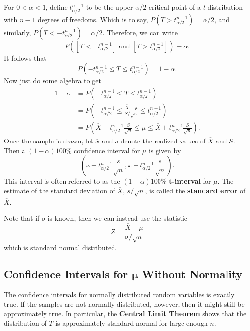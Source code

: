 \documentclass[12pt]{article}
\newcommand{\xbar}{\overline{X}}
\theoremstyle{definition}
\begin{document}
For $0<\alpha<1$, define $t_{\alpha/2}^{n-1}$ to be the upper $\alpha/2$ critical point of a $t$ distribution with $n-1$ degrees of freedoms. Which is to say, $P(T > t_{\alpha/2}^{n-1})=\alpha/2$, and similarly, $P(T < -t_{\alpha/2}^{n-1})=\alpha/2$. Therefore, we can write
	\[P\left( [T < -t_{\alpha/2}^{n-1}] \text{ and } [T > t_{\alpha/2}^{n-1}] \right)	= \alpha.\]
It follows that
	\[P(-t_{\alpha/2}^{n-1} \leq T \leq t_{\alpha/2}^{n-1}) = 1 - \alpha.	\]
	Now just do some algebra to get
\begin{align*}
	1 - \alpha	&= 	P\left(-t_{\alpha/2}^{n-1} \leq T \leq t_{\alpha/2}^{n-1} \right)	\\
		&=	P\left(-t_{\alpha/2}^{n-1} \leq  \frac{\overline{X} - \mu}{S / \sqrt{n}} \leq t_{\alpha/2}^{n-1} \right) 	\\
		&=	P\left(\overline{X} -t_{\alpha/2}^{n-1}\frac{S}{\sqrt{n}} \leq    \mu \leq \overline{X} + t_{\alpha/2}^{n-1}\frac{S}{\sqrt{n}} \right).
\end{align*}
Once the sample is drawn, let $\overline{x}$ and $s$ denote the realized values of $\overline{X}$ and $S$. Then a $(1 - \alpha)100\%$ confidence interval for $\mu$ is given by
	\[	\left(\overline{x} -t_{\alpha/2}^{n-1}\frac{s}{\sqrt{n}},\overline{x} + t_{\alpha/2}^{n-1}\frac{s}{\sqrt{n}} \right)	.\]
This interval is often referred to as the $(1 - \alpha)100\%$ $\bm{t}$\textbf{-interval} for $\mu$. The estimate of the standard deviation of $\overline{X}$, $s/\sqrt{n}$, is called the \textbf{standard error} of $\overline{X}$. 

Note that if $\sigma$ is known, then we can instead use the statistic
	\[Z = \frac{\xbar - \mu}{\sigma/\sqrt{n}} \]
which is standard normal distributed. 



\subsection{Confidence Intervals for $\bm{\mu}$ Without Normality}

The confidence intervals for normally distributed random variables is exactly true. If the samples are not normally distributed, however, then it might still be approximately true. In particular, the \textbf{Central Limit Theorem} shows that the distribution of $T$ is approximately standard normal for large enough $n$.
\end{document}
